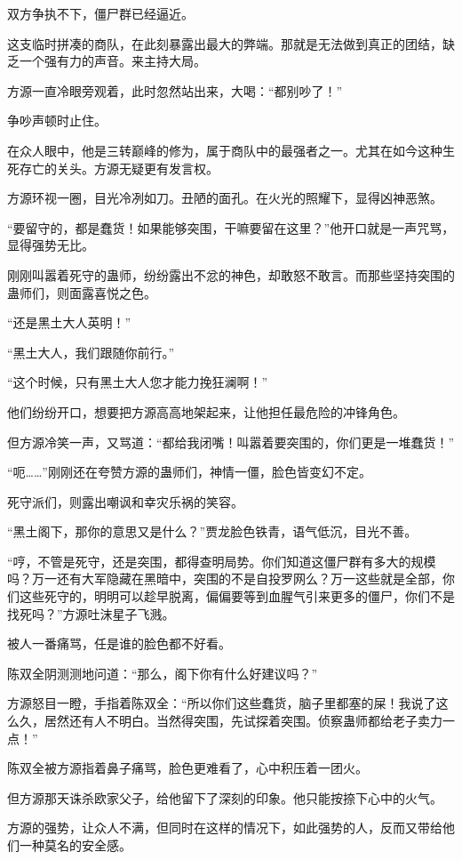 \begin{this_body}
双方争执不下，僵尸群已经逼近。

这支临时拼凑的商队，在此刻暴露出最大的弊端。那就是无法做到真正的团结，缺乏一个强有力的声音。来主持大局。

方源一直冷眼旁观着，此时忽然站出来，大喝：“都别吵了！”

争吵声顿时止住。

在众人眼中，他是三转巅峰的修为，属于商队中的最强者之一。尤其在如今这种生死存亡的关头。方源无疑更有发言权。

方源环视一圈，目光冷冽如刀。丑陋的面孔。在火光的照耀下，显得凶神恶煞。

“要留守的，都是蠢货！如果能够突围，干嘛要留在这里？”他开口就是一声咒骂，显得强势无比。

刚刚叫嚣着死守的蛊师，纷纷露出不忿的神色，却敢怒不敢言。而那些坚持突围的蛊师们，则面露喜悦之色。

“还是黑土大人英明！”

“黑土大人，我们跟随你前行。”

“这个时候，只有黑土大人您才能力挽狂澜啊！”

他们纷纷开口，想要把方源高高地架起来，让他担任最危险的冲锋角色。

但方源冷笑一声，又骂道：“都给我闭嘴！叫嚣着要突围的，你们更是一堆蠢货！”

“呃……”刚刚还在夸赞方源的蛊师们，神情一僵，脸色皆变幻不定。

死守派们，则露出嘲讽和幸灾乐祸的笑容。

“黑土阁下，那你的意思又是什么？”贾龙脸色铁青，语气低沉，目光不善。

“哼，不管是死守，还是突围，都得查明局势。你们知道这僵尸群有多大的规模吗？万一还有大军隐藏在黑暗中，突围的不是自投罗网么？万一这些就是全部，你们这些死守的，明明可以趁早脱离，偏偏要等到血腥气引来更多的僵尸，你们不是找死吗？”方源吐沫星子飞溅。

被人一番痛骂，任是谁的脸色都不好看。

陈双全阴测测地问道：“那么，阁下你有什么好建议吗？”

方源怒目一瞪，手指着陈双全：“所以你们这些蠢货，脑子里都塞的屎！我说了这么久，居然还有人不明白。当然得突围，先试探着突围。侦察蛊师都给老子卖力一点！”

陈双全被方源指着鼻子痛骂，脸色更难看了，心中积压着一团火。

但方源那天诛杀欧家父子，给他留下了深刻的印象。他只能按捺下心中的火气。

方源的强势，让众人不满，但同时在这样的情况下，如此强势的人，反而又带给他们一种莫名的安全感。


\end{this_body}
